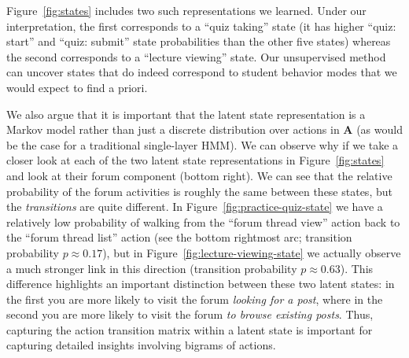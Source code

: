 Figure~\ref{fig:states} includes two such representations we learned. Under
our interpretation, the first corresponds to a ``quiz taking'' state (it
has higher ``quiz: start'' and ``quiz: submit'' state probabilities than
the other five states) whereas the second corresponds to a ``lecture
viewing'' state. Our unsupervised method can uncover states that do indeed
correspond to student behavior modes that we would expect to find a priori.

We also argue that it is important that the latent state representation is
a Markov model rather than just a discrete distribution over actions in
$\mathbf{A}$ (as would be the case for a traditional single-layer HMM). We
can observe why if we take a closer look at each of the two latent state
representations in Figure~\ref{fig:states} and look at their forum
component (bottom right). We can see that the relative probability of the
forum activities is roughly the same between these states, but the
\emph{transitions} are quite different. In
Figure~\ref{fig:practice-quiz-state} we have a relatively low probability
of walking from the ``forum thread view'' action back to the ``forum thread
list'' action (see the bottom rightmost arc; transition probability $p
\approx 0.17$), but in Figure~\ref{fig:lecture-viewing-state} we actually
observe a much stronger link in this direction (transition probability $p
\approx 0.63$). This difference highlights an important distinction between
these two latent states: in the first you are more likely to visit the
forum \emph{looking for a post}, where in the second you are more likely to
visit the forum \emph{to browse existing posts}. Thus, capturing the action
transition matrix within a latent state is important for capturing detailed
insights involving bigrams of actions.

